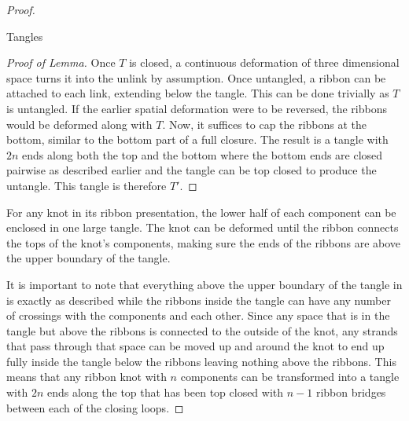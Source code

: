\begin{paper}
\begin{proof}
\begin{paperlem}{Tangles}
\end{paperlem}
\begin{proof}[Proof of Lemma]
Once $T$ is closed, a continuous deformation of three dimensional space turns it
into the unlink by assumption.
Once untangled, a ribbon can be attached to each link, extending below the
tangle.
This can be done trivially as $T$ is untangled.
If the earlier spatial deformation were to be reversed, the ribbons would be
deformed along with $T$.
Now, it suffices to cap the ribbons at the bottom, similar to the bottom part of
a full closure.
The result is a tangle with $2n$ ends along both the top and the bottom where
the bottom ends are closed pairwise as described earlier and the tangle can be
top closed to produce the untangle.
This tangle is therefore $T'$.
\end{proof}
For any knot in its ribbon presentation, the lower half of each component can be
enclosed in one large tangle.
The knot can be deformed until the ribbon connects the tops of the knot's
components, making sure the ends of the ribbons are above the upper boundary of
the tangle.



It is important to note that everything above the upper boundary of the tangle
in \figLowered is exactly as described while the ribbons inside the tangle can
have any number of crossings with the components and each other.
Since any space that is in the tangle but above the ribbons is connected to the
outside of the knot, any strands that pass through that space can be moved up
and around the knot to end up fully inside the tangle below the ribbons leaving
nothing above the ribbons.
This means that any ribbon knot with $n$ components can be transformed into a
tangle with $2n$ ends along the top that has been top closed with $n-1$ ribbon
bridges between each of the closing loops.


\end{proof}
\end{paper}
